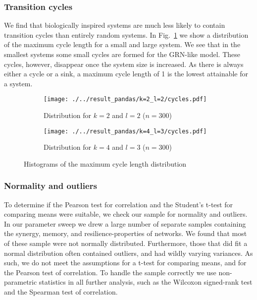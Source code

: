 \documentclass[../main.tex]{subfiles}
\begin{document}
\subsubsection{Transition cycles}

We find that biologically inspired systems are much less likely to contain transition cycles than entirely random systems.
In Fig.~\ref{fig:cycles} we show a distribution of the maximum cycle length for a small and large system.
We see that in the smallest systems some small cycles are formed for the GRN-like model.
These cycles, however, disappear once the system size is increased.
As there is always either a cycle or a sink, a maximum cycle length of 1 is the lowest attainable for a system.

\begin{figure}[ht]
    \centering
    \begin{subfigure}[b]{0.4\textwidth}
        \texttt{[image: ./../result\_pandas/k=2\_l=2/cycles.pdf]}
        \caption{Distribution for $k=2$ and $l=2$ ($n=300$)}
    \end{subfigure}
    \begin{subfigure}[b]{0.4\textwidth}
        \texttt{[image: ./../result\_pandas/k=4\_l=3/cycles.pdf]}
        \caption{Distribution for $k=4$ and $l=3$ ($n=300$)}
    \end{subfigure}
    \caption{Histograms of the maximum cycle length distribution}
    \label{fig:cycles}
\end{figure}


\subsubsection{Normality and outliers}

To determine if the Pearson test for correlation and the Student's t-test for comparing means were suitable, we check our sample for normality and outliers.
In our parameter sweep we drew a large number of separate samples containing the synergy, memory, and resilience-properties of networks.
We found that most of these sample were not normally distributed.
Furthermore, those that did fit a normal distribution often contained outliers, and had wildly varying variances.
As such, we do not meet the assumptions for a t-test for comparing means, and for the Pearson test of correlation.
To handle the sample correctly we use non-parametric statistics in all further analysis, such as the Wilcoxon signed-rank test and the Spearman test of correlation. %
\end{document}
